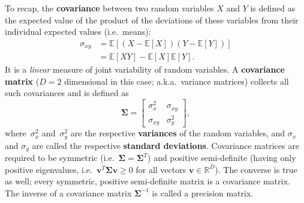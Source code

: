 To recap, the \textbf{covariance} between two random variables $X$ and $Y$ is defined as the expected value of the product of the deviations of these variables from their individual expected values (i.e.~means):
\begin{equation}
  \begin{aligned}
    \sigma_{xy} & = \mathbb{E}[(X - \mathbb{E}[X])(Y - \mathbb{E}[Y])] \\ & = \mathbb{E}[XY] - \mathbb{E}[X]\mathbb{E}[Y].
  \end{aligned}
  \label{eq:covariance}
\end{equation}
It is a \emph{linear} measure of joint variability of random variables.
A \textbf{covariance matrix} ($D = 2$ dimensional in this case; a.k.a.~variance matrices) collects all such covariances and is defined as
\begin{equation}
  \mathbf{\Sigma} = \begin{bmatrix}
    \sigma_x^2  & \sigma_{xy} \\
    \sigma_{xy} & \sigma_y^2
  \end{bmatrix},
\end{equation}
where~$\sigma_x^2$ and~$\sigma_y^2$ are the respective \textbf{variances} of the random variables, and $\sigma_x$ and $\sigma_y$ are called the respective \textbf{standard deviations}.
Covariance matrices are required to be symmetric (i.e.~$\mathbf{\Sigma} = \mathbf{\Sigma}^T$) and positive semi-definite (having only positive eigenvalues, i.e.~$\mathbf{v}^T \mathbf{\Sigma} \mathbf{v} \geq 0$ for all vectors $\mathbf{v} \in \mathbb{R}^D$).
The converse is true as well; every symmetric, positive semi-definite matrix is a covariance matrix.
The inverse of a covariance matrix $\mathbf{\Sigma}^{-1}$ is called a precision matrix.

